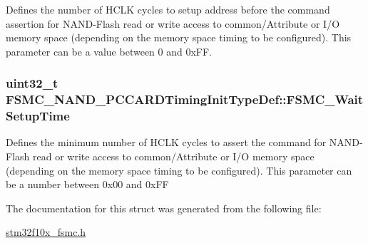 \label{structFSMC__NAND__PCCARDTimingInitTypeDef_a31632aeb49269a29a39e3b191590b6dc}
Defines the number of HCLK cycles to setup address before the command assertion for NAND-\/Flash read or write access to common/Attribute or I/O memory space (depending on the memory space timing to be configured). This parameter can be a value between 0 and 0xFF. \hypertarget{structFSMC__NAND__PCCARDTimingInitTypeDef_a99a7d54ed2674faa5a4e0f2669812855}{
\subsubsection[{FSMC\_\-WaitSetupTime}]{\setlength{\rightskip}{0pt plus 5cm}uint32\_\-t {\bf FSMC\_\-NAND\_\-PCCARDTimingInitTypeDef::FSMC\_\-WaitSetupTime}}}
\label{structFSMC__NAND__PCCARDTimingInitTypeDef_a99a7d54ed2674faa5a4e0f2669812855}
Defines the minimum number of HCLK cycles to assert the command for NAND-\/Flash read or write access to common/Attribute or I/O memory space (depending on the memory space timing to be configured). This parameter can be a number between 0x00 and 0xFF 

The documentation for this struct was generated from the following file:\begin{DoxyCompactItemize}
\item 
\hyperlink{stm32f10x__fsmc_8h}{stm32f10x\_\-fsmc.h}\end{DoxyCompactItemize}
